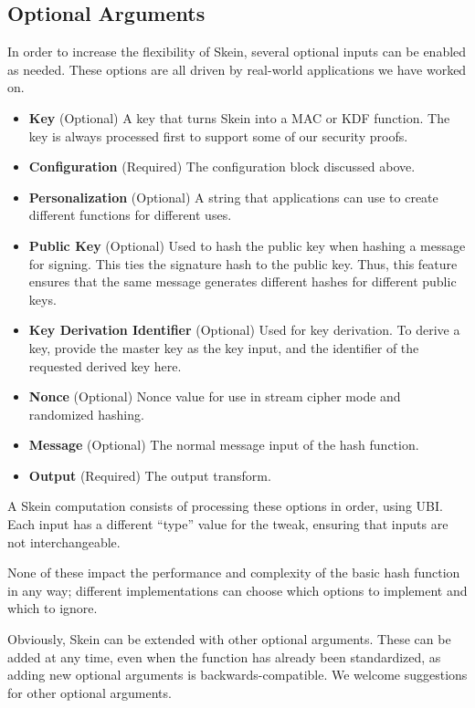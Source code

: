 \documentclass[11pt,twoside]{article}
\begin{document}
\subsection{Optional Arguments}

In order to increase the flexibility of Skein, several optional inputs can be enabled as needed.  These options are all driven by real-world applications we have worked on.

\begin{itemize}
\item {\bf Key} (Optional)  A key that turns Skein into a MAC or KDF function. The key is always processed first to support some of our security proofs.
\item {\bf Configuration} (Required)  The configuration block discussed above.
\item {\bf Personalization}  (Optional)  A string that applications can use to create different functions for different uses.
\item {\bf Public Key}  (Optional)  Used to hash the public key when hashing a message for signing. This ties the signature hash to the public key.  Thus, this feature ensures that the same message generates different hashes for different public keys.
\item {\bf Key Derivation Identifier} (Optional) Used for key derivation. To derive a key, provide the master key as the key input, and the identifier of the requested derived key here.
\item {\bf Nonce}  (Optional)  Nonce value for use in stream cipher mode and randomized hashing.
\item {\bf Message}  (Optional)  The normal message input of the hash function.
\item {\bf Output} (Required)  The output transform.
\end{itemize}

A Skein computation consists of processing these options in order, using UBI.  Each input has a different ``type'' value for the tweak, ensuring that inputs are not interchangeable.

None of these impact the performance and complexity of the basic hash function in any way; different implementations can choose which options to implement and which to ignore.

Obviously, Skein can be extended with other optional arguments.  These can be added at any time, even when the function has already been standardized, as adding new optional arguments is backwards-compatible.  We welcome suggestions for other optional arguments.
\end{document}
